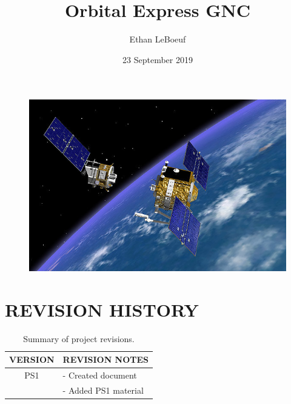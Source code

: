 \documentclass[12pt,a4paper,notitlepage]{article}
\begin{document}
\title{\Huge \textbf{Orbital Express GNC}}
\author{\Large Ethan LeBoeuf}
\date{\Large 23 September 2019}

\begin{minipage}[h]{\textwidth}
	\vspace{4 cm}
	\advance\leftskip-1in
    \maketitle
\end{minipage}

\begin{figure}[H]
\centering
\includegraphics[scale=0.7]{Images/Orbital-Express.png}
\end{figure}

\pagebreak

\section*{\Large REVISION HISTORY}

\begin{table}[h!]
\begin{center}
\begin{tabular} [0.9 \textwidth]{cl}
\hline \hline
\multicolumn{1}{c}{VERSION} & \multicolumn{1}{l}{REVISION NOTES} \\
\hline
PS1 & - Created document \\
    & - Added PS1 material \\
\hline \hline
\end{tabular}
	\caption{Summary of project revisions.}
\end{center}
\end{table}
 
\end{document}
